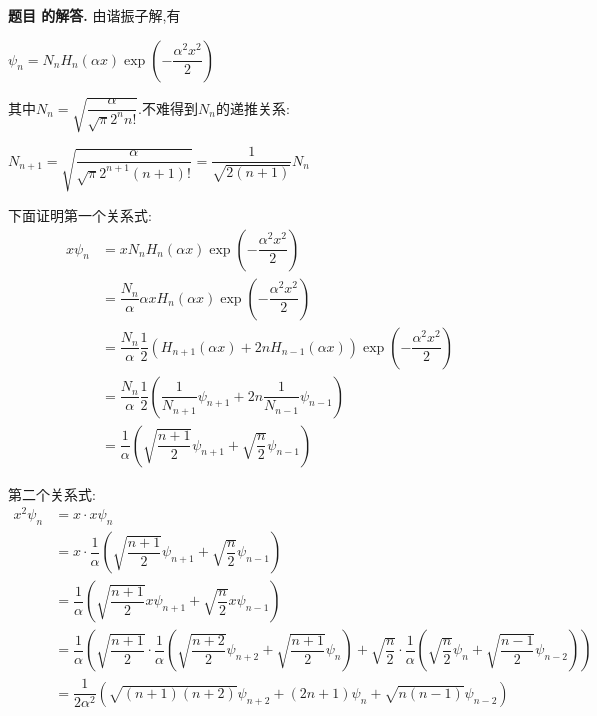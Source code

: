 \documentclass[12pt, a4paper, oneside]{ctexart}
\newcounter{problemname}
\newenvironment{solution}
  {\par\noindent\textbf{题目 \theproblemname 的解答. }}
  {\par}
\begin{document}
\begin{solution}
  由谐振子解,有

  \centerline{$\psi_n = N_n H_n(\alpha x) \exp\left(-\dfrac{\alpha^2 x^2}{2}\right)$}

  其中$N_n = \sqrt{\dfrac{\alpha}{\sqrt{\pi} 2^n n!}}$.不难得到$N_n$的递推关系:

  \centerline{$N_{n+1} = \sqrt{\dfrac{\alpha}{\sqrt{\pi} 2^{n+1} (n+1)!}} = \dfrac{1}{\sqrt{2(n+1)}} N_n$}

  下面证明第一个关系式:
  \begin{align*}
    x\psi_n &= x N_n H_n(\alpha x) \exp\left(-\dfrac{\alpha^2 x^2}{2}\right) \\
    &= \dfrac{N_n}{\alpha} \alpha x H_n(\alpha x) \exp\left(-\dfrac{\alpha^2 x^2}{2}\right) \\
    &= \dfrac{N_n}{\alpha} \dfrac{1}{2} \left(H_{n+1}(\alpha x) + 2n H_{n-1}(\alpha x)\right) \exp\left(-\dfrac{\alpha^2 x^2}{2}\right) \\
    &= \dfrac{N_n}{\alpha} \dfrac{1}{2} \left(\dfrac{1}{N_{n+1}} \psi_{n+1} + 2n \dfrac{1}{N_{n-1}} \psi_{n-1}\right) \\
    &= \dfrac{1}{\alpha} \left(\sqrt{\dfrac{n+1}{2}} \psi_{n+1} + \sqrt{\dfrac{n}{2}} \psi_{n-1}\right)
  \end{align*}

  第二个关系式:
  \begin{align*}
    x^2 \psi_n &= x \cdot x \psi_n \\
    &= x \cdot \dfrac{1}{\alpha} \left(\sqrt{\dfrac{n+1}{2}} \psi_{n+1} + \sqrt{\dfrac{n}{2}} \psi_{n-1}\right) \\
    &= \dfrac{1}{\alpha} \left(\sqrt{\dfrac{n+1}{2}} x\psi_{n+1} + \sqrt{\dfrac{n}{2}} x\psi_{n-1}\right) \\
    &= \dfrac{1}{\alpha} \left(\sqrt{\dfrac{n+1}{2}} \cdot \dfrac{1}{\alpha} (\sqrt{\dfrac{n+2}{2}} \psi_{n+2} + \sqrt{\dfrac{n+1}{2}} \psi_n) + \sqrt{\dfrac{n}{2}} \cdot \dfrac{1}{\alpha} (\sqrt{\dfrac{n}{2}} \psi_n + \sqrt{\dfrac{n-1}{2}} \psi_{n-2})\right)\\
    &= \dfrac{1}{2\alpha^2} (\sqrt{(n+1)(n+2)}\psi_{n+2} + (2n+1)\psi_n + \sqrt{n(n-1)}\psi_{n-2})
  \end{align*}


\end{solution}
\end{document}
